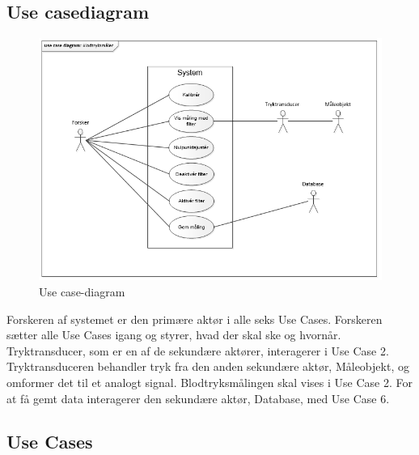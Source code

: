 \subsection{Use casediagram}
\begin{figure}[H]
	\centering
	\includegraphics[width=1\textwidth]{Figurer/1}
	\caption{Use case-diagram}
	\label{fig:Use case-diagram}
\end{figure}

Forskeren af systemet er den primære aktør i alle seks Use Cases. Forskeren sætter alle Use Cases igang og styrer, hvad der skal ske og hvornår. Tryktransducer, som er en af de sekundære aktører, interagerer i Use Case 2. Tryktransduceren behandler tryk fra den anden sekundære aktør, Måleobjekt, og omformer det til et analogt signal. Blodtryksmålingen skal vises i Use Case 2. For at få gemt data interagerer den sekundære aktør, Database, med Use Case 6.  

\subsection{Use Cases}

